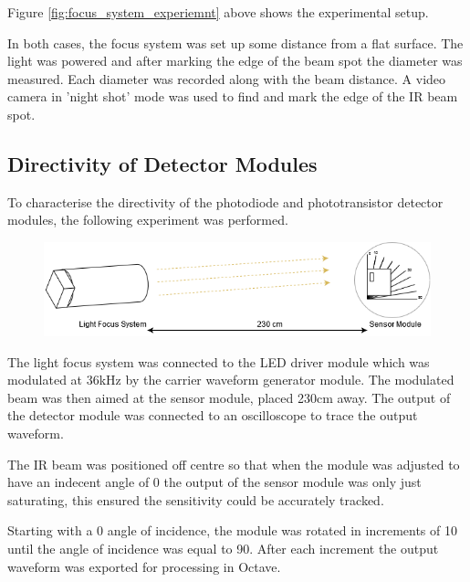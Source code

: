 Figure \ref{fig:focus_system_experiemnt} above shows the experimental setup.

In both cases, the focus system was set up some distance from a flat surface. The light was powered and after marking the edge of the beam spot the diameter was measured. Each diameter was recorded along with the beam distance. A video camera in 'night shot' mode was used to find and mark the edge of the IR beam spot.





\subsection{Directivity of Detector Modules}

To characterise the directivity of the photodiode and phototransistor detector modules, the following experiment was performed.

\begin{figure}[H]
	\centering
	\includegraphics[width=.9\linewidth]{figures/experimentation/beam_angle_of_receiver.png}
	\label{fig:directivity_experiement_setup}
\end{figure}

The light focus system was connected to the LED driver module which was modulated at 36kHz by the carrier waveform generator module. The modulated beam was then aimed at the sensor module, placed 230cm away. The output of the detector module was connected to an oscilloscope to trace the output waveform.

The IR beam was positioned off centre so that when the module was adjusted to have an indecent angle of 0\textdegree{} the output of the sensor module was only just saturating, this ensured the sensitivity could be accurately tracked.

Starting with a 0\textdegree{} angle of incidence, the module was rotated in increments of 10\textdegree{} until the angle of incidence was equal to 90\textdegree. After each increment the output waveform was exported for processing in Octave.

